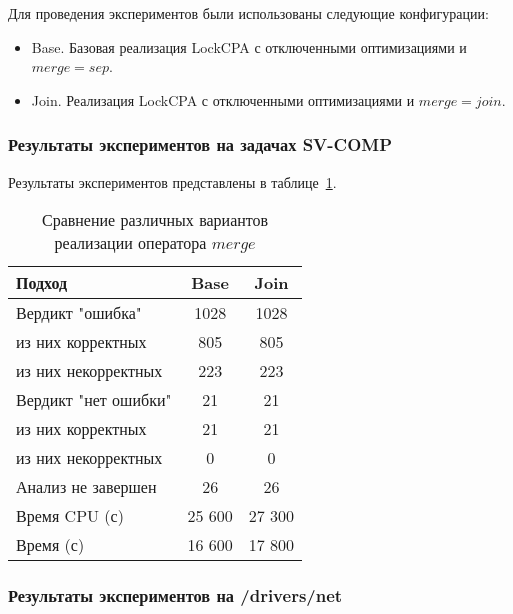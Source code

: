 Для проведения экспериментов были использованы следующие конфигурации:

\begin{itemize}
\item Base. Базовая реализация LockCPA с отключенными оптимизациями и $merge = sep$.
\item Join. Реализация LockCPA с отключенными оптимизациями и $merge = join$.
\end{itemize}

\subsubsection{Результаты экспериментов на задачах SV-COMP}

Результаты экспериментов представлены в таблице~\ref{table-svcomp-lock-merge}.

\begin{center}
  \begin{table}[h]\footnotesize
  	\label{table-svcomp-lock-merge}
    \caption{Сравнение различных вариантов реализации оператора $merge$}
    \begin{tabular}{ | l | c | c |}
      \hline
      Подход         				& Base 	& Join 		\\ \hline
      Вердикт "ошибка" 				& 1028   & 1028   	\\ 
  \hspace{0.5cm} из них корректных 	& 805 	& 805 	 	\\ 
  \hspace{0.5cm} из них некорректных & 223 	& 223 	   	\\ \hline
      Вердикт "нет ошибки"  		& 21    & 21     	\\ 
  \hspace{0.5cm} из них корректных 	& 21 	& 21    	\\
  \hspace{0.5cm} из них некорректных & 0 	& 0    	  	\\ \hline
      Анализ не завершен       		& 26    & 26      	\\ \hline
      Время CPU (с)   				& 25 600 & 27 300  	\\ 
      Время (с)  					& 16 600 & 17 800  	\\
      \hline
    \end{tabular}
  \end{table}
\end{center}

\subsubsection{Результаты экспериментов на /drivers/net}

